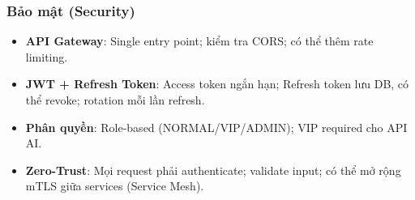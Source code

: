 \subsubsection{Bảo mật (Security)}

\begin{itemize}
    \item \textbf{API Gateway}: Single entry point; kiểm tra CORS; có thể thêm rate limiting.
    \item \textbf{JWT + Refresh Token}: Access token ngắn hạn; Refresh token lưu DB, có thể revoke; rotation mỗi lần refresh.
    \item \textbf{Phân quyền}: Role-based (NORMAL/VIP/ADMIN); VIP required cho API AI.
    \item \textbf{Zero-Trust}: Mọi request phải authenticate; validate input; có thể mở rộng mTLS giữa services (Service Mesh).
\end{itemize}
